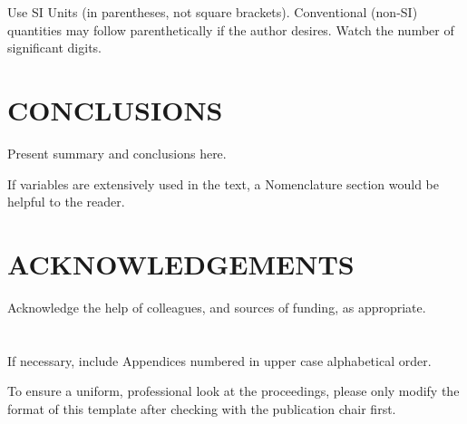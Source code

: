 \documentclass[]{ANStopical}
\begin{document}
Use SI Units (in parentheses, not square brackets).  Conventional (non-SI) quantities may follow parenthetically if the author desires.  Watch the number of significant digits.

\section{CONCLUSIONS}
Present summary and conclusions here.

\printnomenclature 
If variables are extensively used in the text, a Nomenclature section would be helpful to the reader.


\section*{ACKNOWLEDGEMENTS}
Acknowledge the help of colleagues, and sources of funding, as appropriate.





\appendix

\section{}
If necessary, include Appendices numbered in upper case alphabetical order.

To ensure a uniform, professional look at the proceedings, please only modify the format of this template after checking with the publication chair first.
\end{document}
